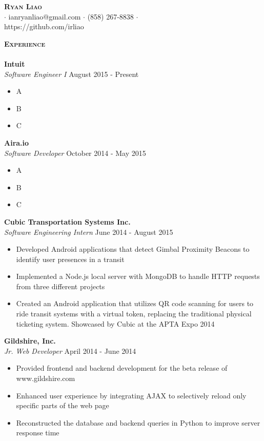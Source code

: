 \documentclass{article}
\newcommand{\lineunder} {
    \vspace*{-8pt} \\
    \hspace*{-18pt} \hrulefill \\
}
\newcommand{\header} [1] {
    {\hspace*{-18pt}\vspace*{6pt} \large{\textbf{\textsc{#1}}}}
    \vspace*{-6pt} \lineunder
}
\begin{document}

\vspace*{-10pt}
\begin{center}
	{\Large \scshape \textbf{Ryan Liao}}\\
	$\cdot$ ianryanliao@gmail.com $\cdot$ (858) 267-8838 $\cdot$\\ https://github.com/irliao\\
\end{center}
\vspace{2mm}

\header{Experience}
\textbf{Intuit} \hfill \\
\textit{Software Engineer I} \hfill August 2015 - Present
\begin{itemize} \itemsep -1pt
	\item A
	\item B
	\item C
\end{itemize}

\textbf{Aira.io} \hfill \\
\textit{Software Developer} \hfill October 2014 - May 2015
\vspace{-1mm}
\begin{itemize} \itemsep -1pt
	\item A
	\item B
	\item C
\end{itemize}

\textbf{Cubic Transportation Systems Inc.} \hfill \\
\textit{Software Engineering Intern} \hfill June 2014 - August 2015
\vspace{-1mm}
\begin{itemize} \itemsep -1pt
	\item Developed Android applications that detect Gimbal Proximity Beacons to identify user presences in a transit
	\item Implemented a Node.js local server with MongoDB to handle HTTP requests from three different projects
	\item Created an Android application that utilizes QR code scanning for users to ride transit systems with a virtual token, replacing the traditional physical ticketing system. Showcased by Cubic at the APTA Expo 2014
\end{itemize}

\textbf{Gildshire, Inc.} \hfill \\
\textit{Jr. Web Developer} \hfill April 2014 - June 2014
\vspace{-1mm}
\begin{itemize} \itemsep -1pt
	\item Provided frontend and backend development for the beta release of www.gildshire.com
	\item Enhanced user experience by integrating AJAX to selectively reload only specific parts of the web page
	\item Reconstructed the database and backend queries in Python to improve server response time
\end{itemize}
\end{document}
